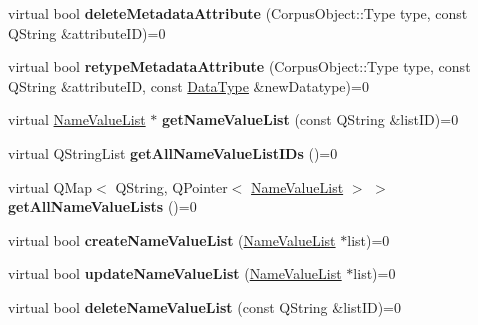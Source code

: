 \begin{DoxyCompactItemize}
\item 
\mbox{\label{class_metadata_datastore_afca95dc5d6531c852068ea7d0722fff8}} 
virtual bool {\bfseries delete\+Metadata\+Attribute} (Corpus\+Object\+::\+Type type, const Q\+String \&attribute\+ID)=0
\item 
\mbox{\label{class_metadata_datastore_af6bb767d285b935e6d23ce57761be133}} 
virtual bool {\bfseries retype\+Metadata\+Attribute} (Corpus\+Object\+::\+Type type, const Q\+String \&attribute\+ID, const \hyperlink{class_data_type}{Data\+Type} \&new\+Datatype)=0
\item 
\mbox{\label{class_metadata_datastore_ad2a469e65b48bbfb8fb8e4967e1787f8}} 
virtual \hyperlink{class_name_value_list}{Name\+Value\+List} $\ast$ {\bfseries get\+Name\+Value\+List} (const Q\+String \&list\+ID)=0
\item 
\mbox{\label{class_metadata_datastore_ab1bbf359740588854d6cf791163e3e4d}} 
virtual Q\+String\+List {\bfseries get\+All\+Name\+Value\+List\+I\+Ds} ()=0
\item 
\mbox{\label{class_metadata_datastore_a81f4b551c0c1c4859fc157bbdb4f7ff4}} 
virtual Q\+Map$<$ Q\+String, Q\+Pointer$<$ \hyperlink{class_name_value_list}{Name\+Value\+List} $>$ $>$ {\bfseries get\+All\+Name\+Value\+Lists} ()=0
\item 
\mbox{\label{class_metadata_datastore_a90d24d00aa186ba7946ac1ceb7b80158}} 
virtual bool {\bfseries create\+Name\+Value\+List} (\hyperlink{class_name_value_list}{Name\+Value\+List} $\ast$list)=0
\item 
\mbox{\label{class_metadata_datastore_a7119258c779037d5d6faebe70682197e}} 
virtual bool {\bfseries update\+Name\+Value\+List} (\hyperlink{class_name_value_list}{Name\+Value\+List} $\ast$list)=0
\item 
\mbox{\label{class_metadata_datastore_a3d8cb839c0811446181792415b1a3df0}} 
virtual bool {\bfseries delete\+Name\+Value\+List} (const Q\+String \&list\+ID)=0
\item 
\mbox{\label{class_metadata_datastore_a0b8b67e8988926659eabac17b95f5156}} 

\end{DoxyCompactItemize}
